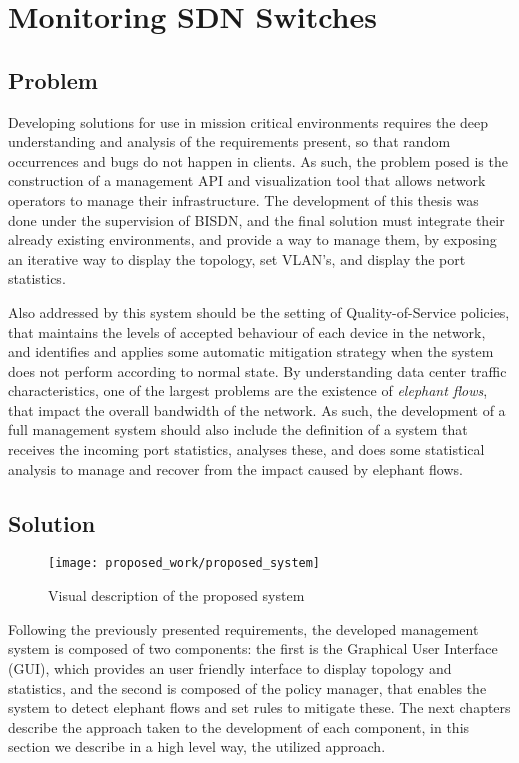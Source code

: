 \chapter{Monitoring SDN Switches} \label{chap:mon_sdn} %

\section {Problem}

Developing solutions for use in mission critical environments requires the deep understanding and analysis of the requirements present, so that random occurrences
and bugs do not happen in clients. As such, the problem posed is the construction of a management API and visualization tool that allows network operators to manage 
their infrastructure. The development of this thesis was done under the supervision of BISDN, and the final solution must integrate their already existing 
environments, and provide a way to manage them, by exposing an iterative way to display the topology, set VLAN's, and display the port statistics. 

\par Also addressed by this system should be the setting of Quality-of-Service policies, that maintains the levels of accepted behaviour of each device in the 
network, and identifies and applies some automatic mitigation strategy when the system does not perform according to normal state. By understanding data center 
traffic characteristics, one of the largest problems are the existence of \textit{elephant flows}, that impact the overall bandwidth of the network. As such, 
the development of a full management system should also include the definition of a system that receives the incoming port statistics, analyses these, and does some 
statistical analysis to manage and recover from the impact caused by elephant flows.

\section {Solution}

\begin{figure} [h]
    \centering
    \texttt{[image: proposed\_work/proposed\_system]}
    \caption{Visual description of the proposed system} \label {fig:pro_sys}
\end{figure}

Following the previously presented requirements, the developed management system is composed of two components: the first is the  Graphical User Interface (GUI), which provides an user friendly interface to display topology and 
statistics, and the second is composed of the policy manager, that enables the system to detect elephant flows and set rules to mitigate these. The next chapters describe the approach taken to the development of each component,
in this section we describe in a high level way, the utilized approach.

